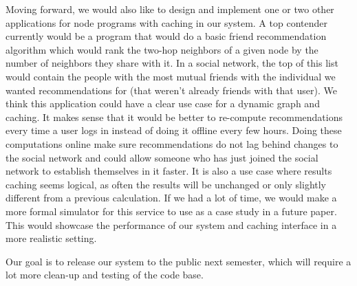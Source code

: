 \documentclass[letterpaper,twocolumn,11pt,tight]{article}
\begin{document}
Moving forward, we would also like to design and implement one or two other applications for node programs with caching in our system.
A top contender currently would be a program that would do a basic friend recommendation algorithm which would rank the two-hop neighbors of a given node by the number of neighbors they share with it.
In a social network, the top of this list would contain the people with the most mutual friends with the individual we wanted recommendations for (that weren't already friends with that user).
We think this application could have a clear use case for a dynamic graph and caching. It makes sense that it would be better to re-compute recommendations every time a user logs in instead of doing it offline every few hours.
Doing these computations online make sure recommendations do not lag behind changes to the social network and could allow someone who has just joined the social network to establish themselves in it faster. It is also a use case where results caching seems logical, as often the results will be unchanged or only slightly different from a previous calculation.
 If we had a lot of time, we would make a more formal simulator for this service to use as a case study in a future paper. This would showcase the performance of our system and caching interface in a more realistic setting.

 Our goal is to release our system to the public next semester, which will require a lot more clean-up and testing of the code base.

\footnotesize

\end{document}
